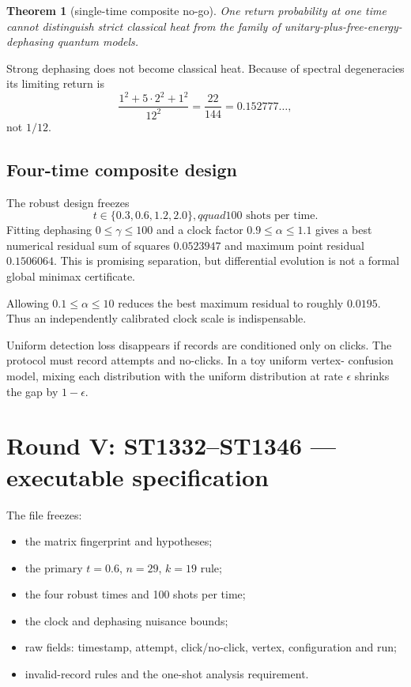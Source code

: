 \documentclass[11pt,a4paper]{article}
\newtheorem{theorem}{Theorem}\newtheorem{proposition}[theorem]{Proposition}
\begin{document}
\begin{theorem}[single-time composite no-go]
One return probability at one time cannot distinguish strict classical heat
from the family of unitary-plus-free-energy-dephasing quantum models.
\end{theorem}

Strong dephasing does not become classical heat.  Because of spectral
degeneracies its limiting return is
\[
 \frac{1^2+5\cdot2^2+1^2}{12^2}=\frac{22}{144}=0.152777\ldots,
\]
not $1/12$.

\subsection{Four-time composite design}

The robust design freezes
\[
 t\in\{0.3,0.6,1.2,2.0\},qquad100\text{ shots per time}.
\]
Fitting dephasing $0\le\gamma\le100$ and a clock factor
$0.9\le\alpha\le1.1$ gives a best numerical residual sum of squares
$0.0523947$ and maximum point residual $0.1506064$.  This is promising
separation, but differential evolution is not a formal global minimax
certificate.

Allowing $0.1\le\alpha\le10$ reduces the best maximum residual to roughly
$0.0195$.  Thus an independently calibrated clock scale is indispensable.

Uniform detection loss disappears if records are conditioned only on clicks.
The protocol must record attempts and no-clicks.  In a toy uniform vertex-
confusion model, mixing each distribution with the uniform distribution at
rate $\epsilon$ shrinks the gap by $1-\epsilon$.

\section{Round V: ST1332--ST1346 --- executable specification}

The file  freezes:
\begin{itemize}
\item the matrix fingerprint and hypotheses;
\item the primary $t=0.6$, $n=29$, $k=19$ rule;
\item the four robust times and 100 shots per time;
\item the clock and dephasing nuisance bounds;
\item raw fields: timestamp, attempt, click/no-click, vertex, configuration and run;
\item invalid-record rules and the one-shot analysis requirement.
\end{itemize}
\end{document}
